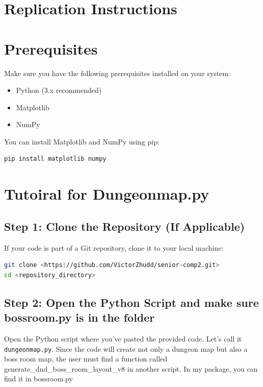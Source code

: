 \documentclass[10pt,twocolumn]{article}
\begin{document}
\section{Replication Instructions}
\section{Prerequisites}

Make sure you have the following prerequisites installed on your system:

\begin{itemize}
    \item Python (3.x recommended)
    \item Matplotlib
    \item NumPy
\end{itemize}

You can install Matplotlib and NumPy using pip:

\begin{lstlisting}[language=bash]
pip install matplotlib numpy
\end{lstlisting}
\section{Tutoiral for Dungeonmap.py}
\subsection{Step 1: Clone the Repository (If Applicable)}

If your code is part of a Git repository, clone it to your local machine:

\begin{lstlisting}[language=bash]
git clone <https://github.com/VictorZhudd/senior-comp2.git>
cd <repository_directory>
\end{lstlisting}

\subsection{Step 2: Open the Python Script and make sure bossroom.py is in the folder}

Open the Python script where you've pasted the provided code. Let's call it \texttt{dungeonmap.py}. Since the code will create not only a dungeon map but also a boss room map, the user must find a function called generate\_dnd\_boss\_room\_layout\_v8 in another script. In my package, you can find it in bossroom.py
\end{document}
